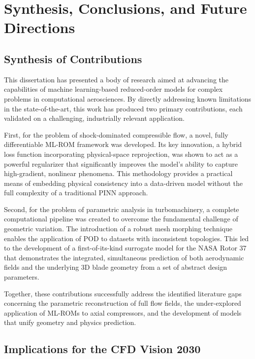 \documentclass[12pt, a4paper]{report}
\begin{document}
\chapter{Synthesis, Conclusions, and Future Directions}

\section{Synthesis of Contributions}

This dissertation has presented a body of research aimed at advancing the capabilities of machine learning-based reduced-order models for complex problems in computational aerosciences. By directly addressing known limitations in the state-of-the-art, this work has produced two primary contributions, each validated on a challenging, industrially relevant application.

First, for the problem of shock-dominated compressible flow, a novel, fully differentiable ML-ROM framework was developed. Its key innovation, a hybrid loss function incorporating physical-space reprojection, was shown to act as a powerful regularizer that significantly improves the model's ability to capture high-gradient, nonlinear phenomena. This methodology provides a practical means of embedding physical consistency into a data-driven model without the full complexity of a traditional PINN approach.

Second, for the problem of parametric analysis in turbomachinery, a complete computational pipeline was created to overcome the fundamental challenge of geometric variation. The introduction of a robust mesh morphing technique enables the application of POD to datasets with inconsistent topologies. This led to the development of a first-of-its-kind surrogate model for the NASA Rotor 37 that demonstrates the integrated, simultaneous prediction of both aerodynamic fields and the underlying 3D blade geometry from a set of abstract design parameters.

Together, these contributions successfully address the identified literature gaps concerning the parametric reconstruction of full flow fields, the under-explored application of ML-ROMs to axial compressors, and the development of models that unify geometry and physics prediction.

\section{Implications for the CFD Vision 2030}
\end{document}
